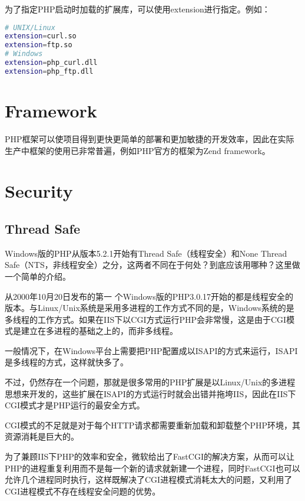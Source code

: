 为了指定PHP启动时加载的扩展库，可以使用extension进行指定。例如：

\begin{lstlisting}[language=bash]
# UNIX/Linux
extension=curl.so
extension=ftp.so
# Windows
extension=php_curl.dll
extension=php_ftp.dll
\end{lstlisting}




\chapter{Framework}

PHP框架可以使项目得到更快更简单的部署和更加敏捷的开发效率，因此在实际生产中框架的使用已非常普遍，例如PHP官方的框架为Zend framework。













\chapter{Security}


\section{Thread Safe}

Windows版的PHP从版本5.2.1开始有Thread Safe（线程安全）和None Thread Safe（NTS，非线程安全）之分，这两者不同在于何处\cite{thread_safe}？到底应该用哪种？这里做一个简单的介绍。

从2000年10月20日发布的第一 个Windows版的PHP3.0.17开始的都是线程安全的版本。与Linux/Unix系统是采用多进程的工作方式不同的是，Windows系统的是多线程的工作方式。如果在IIS下以CGI方式运行PHP会非常慢，这是由于CGI模式是建立在多进程的基础之上的，而非多线程。

一般情况下，在Windows平台上需要把PHP配置成以ISAPI的方式来运行，ISAPI是多线程的方式，这样就快多了。



不过，仍然存在一个问题，那就是很多常用的PHP扩展是以Linux/Unix的多进程思想来开发的，这些扩展在ISAPI的方式运行时就会出错并拖垮IIS，因此在IIS下CGI模式才是PHP运行的最安全方式。

CGI模式的不足就是对于每个HTTP请求都需要重新加载和卸载整个PHP环境，其资源消耗是巨大的。

为了兼顾IIS下PHP的效率和安全，微软给出了FastCGI的解决方案，从而可以让PHP的进程重复利用而不是每一个新的请求就新建一个进程，同时FastCGI也可以允许几个进程同时执行，这样既解决了CGI进程模式消耗太大的问题，又利用了CGI进程模式不存在线程安全问题的优势。

